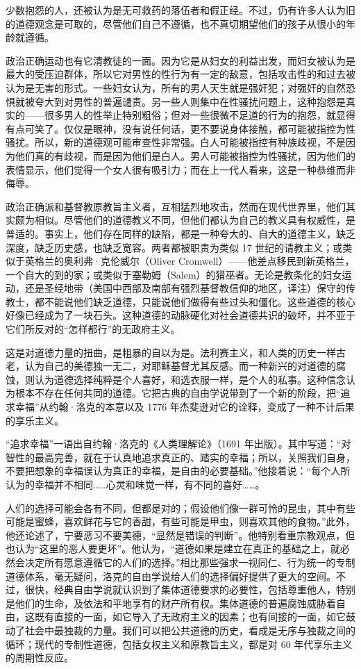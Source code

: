 少数抱怨的人，还被认为是无可救药的落伍者和假正经。不过，仍有许多人认为旧的道德观念是可取的，尽管他们自己不遵循，也不真切期望他们的孩子从很小的年龄就遵循。

政治正确运动也有它清教徒的一面。因为它是从妇女的利益出发，而妇女被认为是最大的受压迫群体，所以它对男性的性行为有一定的敌意，包括攻击性的和过去被认为是无害的形式。一些妇女认为，所有的男人天生就是强奸犯；对强奸的自然恐惧就被夸大到对男性的普遍谴责。另一些人则集中在性骚扰问题上，这种抱怨是真实的——很多男人的性举止特别粗俗；但对一些很微不足道的行为的抱怨，就显得有点可笑了。仅仅是眼神，没有说任何话，更不要说身体接触，都可能被指控为性骚扰。所以，新的道德观可能审查性非常强。白人可能被指控有种族歧视，不是因为他们真的有歧视，而是因为他们是白人。男人可能被指控为性骚扰，因为他们的表情显示，他们觉得一个女人很有吸引力；而在上一代人看来，这是一种恭维而非侮辱。

政治正确派和基督教原教旨主义者，互相猛烈地攻击，然而在现代世界里，他们其实颇为相似。尽管他们的道德教义不同，但他们都认为自己的教义具有权威性，是普适的。事实上，他们存在同样的缺陷，都是一种夸大的、自大的道德主义，缺乏深度，缺乏历史感，也缺乏宽容。两者都被职责为类似 17 世纪的请教主义；或类似于英格兰的奥利弗·克伦威尔（Oliver Cromwell）——他差点移民到新英格兰，一个自大的到的家；或类似于塞勒姆（Salem）的猎巫者。无论是教条化的妇女运动，还是圣经地带（美国中西部及南部有强烈基督教信仰的地区，译注）保守的传教士，都不能说他们缺乏道德，只能说他们做得有些过头和僵化。这些道德的核心好像已经成为了一块石头。这种道德的动脉硬化对社会道德共识的破坏，并不亚于它们所反对的“怎样都行”的无政府主义。

这是对道德力量的扭曲，是粗暴的自以为是。法利赛主义，和人类的历史一样古老，认为自己的美德独一无二，对耶稣基督尤其反感。而一种新兴的对道德的腐蚀，则认为道德选择纯粹是个人喜好，和选衣服一样，是个人的私事。这种信念认为根本不存在任何共同的道德。它把古典的自由学说带到了一个新的阶段，把“追求幸福”从约翰·洛克的本意以及 1776 年杰斐逊对它的诠释，变成了一种不计后果的享乐主义。

“追求幸福”一语出自约翰·洛克的《人类理解论》（1691 年出版）。其中写道：“对智性的最高完善，就在于认真地追求真正的、踏实的幸福；所以，关照我们自身，不要把想象的幸福误认为真正的幸福，是自由的必要基础。”他接着说：“每个人所认为的幸福并不相同……心灵和味觉一样，有不同的喜好……。

人们的选择可能会各有不同，但都是对的；假设他们像一群可怜的昆虫，其中有些可能是蜜蜂，喜欢鲜花与它的香甜，有些可能是甲虫，则喜欢其他的食物。”此外，他还论述了，宁要恶习不要美德，“显然是错误的判断”。他特别看重宗教观点，但也认为“这里的恶人要更坏”。他认为，“道德如果是建立在真正的基础之上，就必然会决定所有愿意遵循它的人们的选择。”相比那些强求一视同仁、行为统一的专制道德体系，毫无疑问，洛克的自由学说给人们的选择偏好提供了更大的空间。不过，很快，经典自由学说就认识到了集体道德要求的必要性，包括尊重他人，特别是他们的生命，及依法和平地享有的财产所有权。集体道德的普遍腐蚀威胁着自由，这既有直接的一面，如它导入了无政府主义的因素；也有间接的一面，如它鼓动了社会中最独裁的力量。我们可以把公共道德的历史，看成是无序与独裁之间的循环；现代的专制性道德，包括女权主义和原教旨主义，都是对 60 年代享乐主义的周期性反应。

